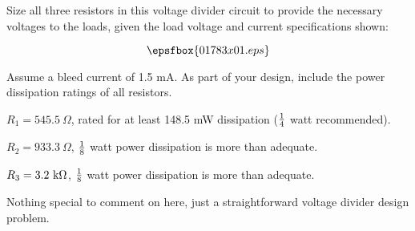 

Size all three resistors in this voltage divider circuit to provide the necessary voltages to the loads, given the load voltage and current specifications shown:

$$\epsfbox{01783x01.eps}$$

Assume a bleed current of 1.5 mA.  As part of your design, include the power dissipation ratings of all resistors.







$R_1 = 545.5 \> \Omega$, rated for at least 148.5 mW dissipation ($1 \over 4$ watt recommended).

$R_2 = 933.3 \> \Omega$, $1 \over 8$ watt power dissipation is more than adequate. 

$R_3 = 3.2 \hbox{ k} \Omega$, $1 \over 8$ watt power dissipation is more than adequate.







Nothing special to comment on here, just a straightforward voltage divider design problem.




